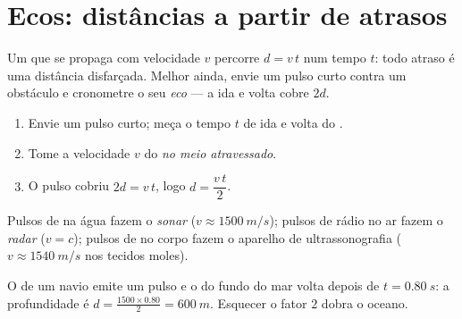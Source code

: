 \section{Ecos: distâncias a partir de atrasos}

Um  que se propaga com velocidade $v$ percorre $d = v\,t$ num tempo
$t$: todo atraso é uma distância disfarçada. Melhor ainda, envie um pulso
curto contra um obstáculo e cronometre o seu \emph{eco} --- a
ida e volta cobre $2d$.

\begin{method}\label{met:g10:signals-and-waves:echo}
\begin{enumerate}
  \item Envie um pulso curto; meça o tempo $t$ de ida e volta do .
  \item Tome a velocidade $v$ do  \emph{no meio atravessado}.
  \item O pulso cobriu $2d = v\,t$, logo $d = \dfrac{v\,t}{2}$.
\end{enumerate}
Pulsos de  na água fazem o \emph{sonar}
($v \approx \qty{1500}{m/s}$); pulsos de rádio no ar fazem o
\emph{radar} ($v = c$); pulsos de  no corpo fazem o
aparelho de ultrassonografia ($v \approx \qty{1540}{m/s}$ nos tecidos
moles).
\end{method}

\begin{example}[Sonar]\label{ex:g10:signals-and-waves:sonar}
O  de um navio emite um pulso e o  do fundo do mar volta depois
de $t = \qty{0.80}{s}$: a profundidade é
$d = \frac{1500 \times 0.80}{2} = \qty{600}{m}$. Esquecer o fator $2$
dobra o oceano.
\end{example}

